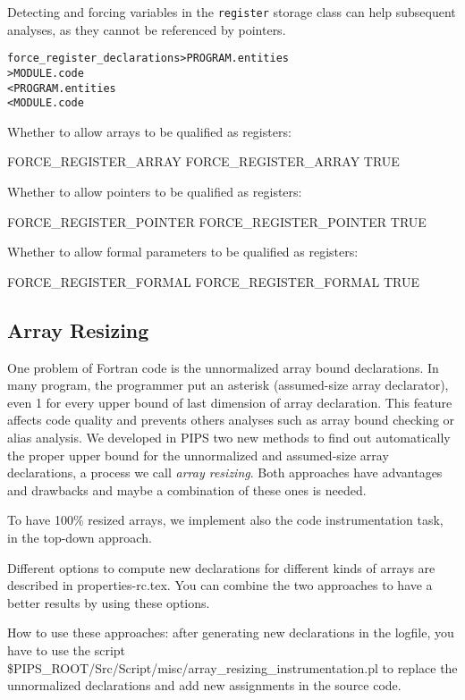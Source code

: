 \documentclass[a4paper]{report}
\newenvironment{PipsMake}{\begin{alltt}}{\end{alltt}}
\begin{document}
Detecting and forcing variables in the \texttt{register} storage class can
help subsequent analyses, as they cannot be referenced by pointers.
\begin{PipsMake}
force_register_declarations > PROGRAM.entities
                            > MODULE.code
         < PROGRAM.entities
         < MODULE.code
\end{PipsMake}

Whether to allow arrays to be qualified as registers:
\begin{PipsProp}{FORCE_REGISTER_ARRAY}
FORCE_REGISTER_ARRAY TRUE
\end{PipsProp}

Whether to allow pointers to be qualified as registers:
\begin{PipsProp}{FORCE_REGISTER_POINTER}
FORCE_REGISTER_POINTER TRUE
\end{PipsProp}

Whether to allow formal parameters to be qualified as registers:
\begin{PipsProp}{FORCE_REGISTER_FORMAL}
FORCE_REGISTER_FORMAL TRUE
\end{PipsProp}

\subsection{Array Resizing}
\label{subsubsection-array-resizing}

One problem of Fortran code is the unnormalized array bound
declarations. In many program, the programmer put an asterisk
(assumed-size array declarator), even 1 for every
upper bound of last dimension of array declaration. This feature affects
code quality and prevents others analyses such as array bound checking or
alias analysis. We developed in PIPS two new methods to find out
automatically the proper upper bound for the unnormalized and assumed-size
array declarations, a process we call {\em array resizing}. Both
approaches have advantages and drawbacks and maybe a combination of these
ones is needed.

To have 100\% resized arrays, we implement also the code instrumentation
task, in the top-down approach.

Different options to compute new declarations for different kinds of
arrays are described in properties-rc.tex. You can combine the two
approaches to have a better results by using these options.

How to use these approaches: after generating new declarations in the
logfile, you have to use the script
\$PIPS\_ROOT/Src/Script/misc/array\_resizing\_instrumentation.pl to replace the unnormalized
declarations and add new assignments in the source code.
\end{document}

